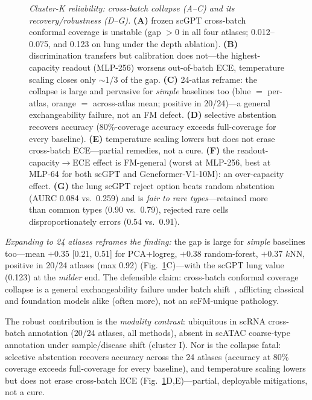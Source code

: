 \documentclass[journal]{IEEEtran}
\begin{document}
\begin{figure}[!t]\centering
\resizebox{\textwidth}{!}{}
\caption{\emph{Cluster-K reliability: cross-batch collapse (A--C) and its recovery/robustness (D--G).} \textbf{(A)} frozen scGPT cross-batch conformal coverage is unstable (gap $>0$ in all four atlases; 0.012--0.075, and 0.123 on lung under the depth ablation). \textbf{(B)} discrimination transfers but calibration does not---the highest-capacity readout (MLP-256) worsens out-of-batch ECE, temperature scaling closes only $\sim$1/3 of the gap. \textbf{(C)} 24-atlas reframe: the collapse is large and pervasive for \emph{simple} baselines too (blue $=$ per-atlas, orange $=$ across-atlas mean; positive in 20/24)---a general exchangeability failure, not an FM defect. \textbf{(D)} selective abstention recovers accuracy (80\%-coverage accuracy exceeds full-coverage for every baseline). \textbf{(E)} temperature scaling lowers but does not erase cross-batch ECE---partial remedies, not a cure. \textbf{(F)} the readout-capacity$\to$ECE effect is FM-general (worst at MLP-256, best at MLP-64 for both scGPT and Geneformer-V1-10M): an over-capacity effect. \textbf{(G)} the lung scGPT reject option beats random abstention (AURC 0.084 vs.\ 0.259) and is \emph{fair to rare types}---retained more than common types (0.90 vs.\ 0.79), rejected rare cells disproportionately errors (0.54 vs.\ 0.91).}\label{fig:reliabK}\end{figure}

\emph{Expanding to 24 atlases reframes the finding:} the gap is large for \emph{simple} baselines too---mean $+0.35$ [0.21, 0.51] for PCA+logreg, $+0.38$ random-forest, $+0.37$ $k$NN, positive in 20/24 atlases (max 0.92) (Fig.~\ref{fig:reliabK}C)---with the scGPT lung value (0.123) at the \emph{milder} end. The defensible claim: cross-batch conformal coverage collapse is a general exchangeability failure under batch shift~\cite{barber2023}, afflicting classical and foundation models alike (often more), not an scFM-unique pathology.

The robust contribution is the \emph{modality contrast}: ubiquitous in scRNA cross-batch annotation (20/24 atlases, all methods), absent in scATAC coarse-type annotation under sample/disease shift (cluster I). Nor is the collapse fatal: selective abstention recovers accuracy across the 24 atlases (accuracy at 80\% coverage exceeds full-coverage for every baseline), and temperature scaling lowers but does not erase cross-batch ECE (Fig.~\ref{fig:reliabK}D,E)---partial, deployable mitigations, not a cure.
\end{document}
